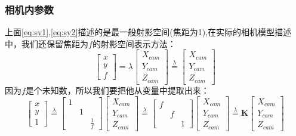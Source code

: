 \documentclass[12pt]{article}
\begin{document}
\subsubsection{相机内参数}
上面\ref{eq:sy1},\ref{eq:sy2}描述的是最一般射影空间(焦距为1),在实际的相机模型描述中，我们还保留焦距为$f$的射影空间表示方法：
\begin{equation}
    \label{eq:nc_basic}
    \left[\begin{array}{l}
        x \\
        y \\
        f
        \end{array}\right]=\lambda\left[\begin{array}{l}
            X_{cam} \\
            Y_{cam} \\
            Z_{cam}
            \end{array}\right]
        \overset{\lambda}{=}\left[\begin{array}{l}
        X_{cam} \\
        Y_{cam} \\
        Z_{cam}
        \end{array}\right]
\end{equation}
因为$f$是个未知数，所以我们要把他从变量中提取出来：
\begin{equation}
    \left[\begin{array}{l}
        x \\
        y \\
        1
        \end{array}\right]\overset{\lambda}{=}
        \left[\begin{array}{lll}
            1 &  & \\
              & 1 &\\
              &   & \frac{1}{f}
        \end{array}\right]
        \left[\begin{array}{l}
        X_{cam} \\
        Y_{cam} \\
        Z_{cam}
        \end{array}\right]\overset{\lambda}{=}
    \left[\begin{array}{lll}
        f &  & \\
          & f &\\
          &   & 1
    \end{array}\right]
    \left[\begin{array}{l}
    X_{cam} \\
    Y_{cam} \\
    Z_{cam}
    \end{array}\right]\overset{\lambda}{=}\mathbf{K}\left[\begin{array}{l}
        X_{cam} \\
        Y_{cam} \\
        Z_{cam}
        \end{array}\right]
    \label{eq:nc}
\end{equation}
\end{document}
